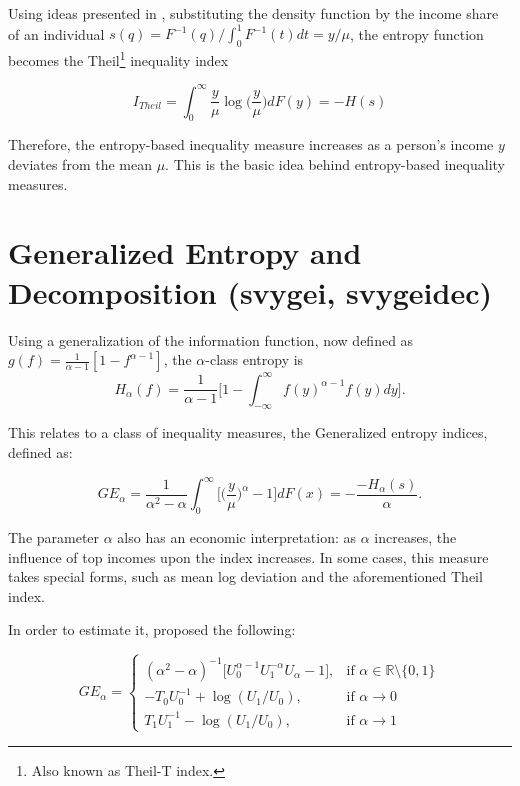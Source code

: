 \documentclass[
]{book}
\begin{document}
Using ideas presented in \textcite{cowell2009}, substituting the density function by the income share of an individual \(s(q) = {F}^{-1}(q) / \int_{0}^{1} F^{-1}(t)dt = y/\mu\), the entropy function becomes the Theil\footnote{Also known as Theil-T index.} inequality index

\[
I_{Theil} = \int_{0}^{\infty} \frac{y}{\mu} \log \bigg( \frac{y}{\mu} \bigg) dF(y) = -H(s)
\]

Therefore, the entropy-based inequality measure increases as a person's income \(y\) deviates from the mean \(\mu\). This is the basic idea behind entropy-based inequality measures.

\hypertarget{generalized-entropy-and-decomposition-svygei-svygeidec}{%
\section{Generalized Entropy and Decomposition (svygei, svygeidec)}\label{generalized-entropy-and-decomposition-svygei-svygeidec}}

Using a generalization of the information function, now defined as \(g(f) = \frac{1}{\alpha-1} [ 1 - f^{\alpha - 1} ]\), the \(\alpha\)-class entropy is
\[
H_\alpha(f) = \frac{1}{\alpha - 1} \bigg[ 1 - \int_{-\infty}^{\infty} f(y)^{ \alpha - 1} f(y) dy \bigg] \text{.}
\]

This relates to a class of inequality measures, the Generalized entropy indices, defined as:

\[
GE_\alpha = \frac{1}{\alpha^2 - \alpha} \int_{0}^\infty \bigg[ \bigg( \frac{y}{\mu} \bigg)^\alpha - 1 \bigg]dF(x) = - \frac{-H_\alpha(s) }{ \alpha } \text{.}
\]

The parameter \(\alpha\) also has an economic interpretation: as \(\alpha\) increases, the influence of top incomes upon the index increases. In some cases, this measure takes special forms, such as mean log deviation and the aforementioned Theil index.

In order to estimate it, \textcite{biewen2003} proposed the following:

\[
GE_\alpha =
\begin{cases}
( \alpha^2 - \alpha)^{-1} \big[ U_0^{\alpha - 1} U_1^{-\alpha} U_\alpha -1 \big], & \text{if } \alpha \in \mathbb{R} \setminus \{0,1\} \\
- T_0 U_0^{-1} + \log ( U_1 / U_0 ), &\text{if } \alpha \rightarrow 0 \\
T_1 U_1^{-1} - \log ( U_1 / U_0 ), & \text{if } \alpha \rightarrow 1
\end{cases}
\]
\end{document}
